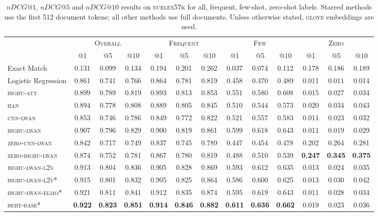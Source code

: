 \documentclass[11pt,a4paper]{article}
\newcommand{\bigruatt}{\textsc{bigru-att}\xspace}
\newcommand{\han}{\textsc{han}\xspace}
\newcommand{\lwancnn}{\textsc{cnn-lwan}\xspace}
\newcommand{\zlwancnn}{\textsc{zero-cnn-lwan}\xspace}
\newcommand{\lwangru}{\textsc{bigru-lwan}\xspace}
\newcommand{\lwangrulv}{\textsc{bigru-lwan-l2v}}
\newcommand{\lwangruelmo}{\textsc{bigru-lwan-elmo}}
\newcommand{\zlwangru}{\textsc{zero-bigru-lwan}\xspace}
\newcommand{\glove}{\textsc{glove}\xspace}
\newcommand{\bertbase}{\textsc{bert-base}\xspace}
\newcommand{\newdata}{\textsc{eurlex57k}\xspace}
\begin{document}
\vspace{-2mm}

\begin{table*}[h!]
\centering
{
\footnotesize\addtolength{\tabcolsep}{-2pt}
\begin{tabular}{lcccccccccccc}
  \hline
  & \multicolumn{3}{c}{\textsc{Overall}} & \multicolumn{3}{c}{\textsc{Frequent}} & \multicolumn{3}{c}{\textsc{Few}} & \multicolumn{3}{c}{\textsc{Zero}} \\ 
  & @1 & @5 & @10 & @1 & @5 & @10 & @1 & @5 & @10 & @1 & @5 & @10 \\
  \cline{2-13}
  Exact Match & 0.131 & 0.099 & 0.134 & 0.194 & 0.201 & 0.262 & 0.037 & 0.074 & 0.112 & 0.178 & 0.186 & 0.189 \\
  Logistic Regression & 0.861 & 0.741 & 0.766 & 0.864 & 0.781 & 0.819 & 0.458 & 0.470 & 0.489 & 0.011 & 0.011 & 0.014 \\
  \hline
  \bigruatt & 0.899 & 0.789 & 0.819 & 0.893 & 0.813 & 0.853 & 0.551 & 0.580 & 0.608 & 0.015 & 0.027 & 0.034 \\
  \han & 0.894 & 0.778 & 0.808 & 0.889 & 0.805 & 0.845 & 0.510 & 0.544 & 0.573 & 0.020 & 0.034 & 0.043 \\
  \hline
 \lwancnn & 0.853 & 0.746 & 0.786 & 0.849 & 0.772 & 0.822 & 0.521 & 0.557 & 0.583 & 0.011 & 0.023 & 0.032 \\
  \lwangru & 0.907 & 0.796 & 0.829 & 0.900 & 0.819 & 0.861 & 0.599 & 0.618 & 0.643 & 0.011 & 0.019 & 0.029 \\
   \hline
  \zlwancnn & 0.842 & 0.717 & 0.749 & 0.837 & 0.745 & 0.789 & 0.447 & 0.454 & 0.478 & 0.202 & 0.264 & 0.281 \\
  \zlwangru & 0.874 & 0.752 & 0.781 & 0.867 & 0.780 & 0.819 & 0.488 & 0.510 & 0.539 & \textbf{0.247} & \textbf{0.345} & \textbf{0.375} \\
  \hline\hline
   \lwangrulv & 0.913 & 0.804 & 0.836 & 0.905 & 0.828 & 0.869 & 0.593 & 0.612 & 0.635 & 0.013 & 0.024 & 0.035 \\
\hline
\lwangrulv* & 0.915 & 0.801 & 0.832 & 0.905 & 0.825 & 0.864 & 0.586 & 0.600 & 0.625 & 0.013 & 0.030 & 0.042 \\
\lwangruelmo* & 0.921 & 0.811 & 0.841 & 0.912 & 0.835 & 0.874 & 0.595 & 0.619 & 0.643 & 0.011 & 0.028 & 0.034 \\
  \bertbase* & \textbf{0.922} & \textbf{0.823} & \textbf{0.851} & \textbf{0.914} & \textbf{0.846} & \textbf{0.882} & \textbf{0.611} & \textbf{0.636} & \textbf{0.662} & 0.019 & 0.023 & 0.036 \\
  \hline
\end{tabular}
}
\caption{$nDCG@1$, $nDCG@5$ and $nDCG@10$ results on \newdata for all, frequent, few-shot, zero-shot labels. Starred methods use the first 512 document tokens; all other methods use full documents. Unless otherwise stated, \glove embeddings are used.}
\label{tab:ngcgresults}
\end{table*}
\end{document}
